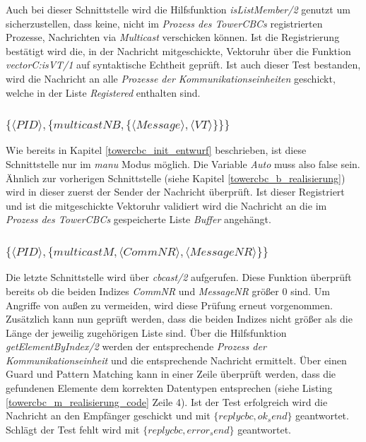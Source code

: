 Auch bei dieser Schnittstelle wird die Hilfsfunktion \textit{isListMember/2} genutzt um sicherzustellen, dass keine, nicht im \textit{Prozess des TowerCBCs} registrierten Prozesse, Nachrichten via \textit{Multicast} verschicken können. Ist die Registrierung bestätigt wird die, in der Nachricht mitgeschickte, Vektoruhr über die Funktion \textit{vectorC:isVT/1} auf syntaktische Echtheit geprüft. Ist auch dieser Test bestanden, wird die Nachricht an alle \textit{Prozesse der Kommunikationseinheiten} geschickt, welche in der Liste \textit{Registered} enthalten sind. 

\subsubsection{$\{\langle PID\rangle,\{multicastNB,\{\langle Message\rangle,\langle VT\rangle\}\}\}$} \label{towercbc_nb_realisierung}

Wie bereits in Kapitel \ref{towercbc_init_entwurf} beschrieben, ist diese Schnittstelle nur im \textit{manu} Modus möglich. Die Variable \textit{Auto} muss also false sein. Ähnlich zur vorherigen Schnittstelle (siehe Kapitel \ref{towercbc_b_realisierung}) wird in dieser zuerst der Sender der Nachricht überprüft. Ist dieser Registriert und ist die mitgeschickte Vektoruhr validiert wird die Nachricht an die im \textit{Prozess des TowerCBCs} gespeicherte Liste \textit{Buffer} angehängt.

\subsubsection{$\{\langle PID\rangle,\{multicastM,\langle CommNR\rangle,\langle MessageNR\rangle\}\}$} \label{towercbc_m_realisierung}

Die letzte Schnittstelle wird über \textit{cbcast/2} aufgerufen. Diese Funktion überprüft bereits ob die beiden Indizes \textit{CommNR} und \textit{MessageNR} größer 0 sind. Um Angriffe von außen zu vermeiden, wird diese Prüfung erneut vorgenommen. Zusätzlich kann nun geprüft werden, dass die beiden Indizes nicht größer als die Länge der jeweilig zugehörigen Liste sind. Über die Hilfsfunktion \textit{getElementByIndex/2} werden der entsprechende \textit{Prozess der Kommunikationseinheit} und die entsprechende Nachricht ermittelt. Über einen Guard und Pattern Matching kann in einer Zeile überprüft werden, dass die gefundenen Elemente dem korrekten Datentypen entsprechen (siehe Listing \ref{towercbc_m_realisierung_code} Zeile 4).
Ist der Test erfolgreich wird die Nachricht an den Empfänger geschickt und mit $\{replycbc, ok_send\}$ geantwortet. Schlägt der Test fehlt wird mit $\{replycbc, error_send\}$ geantwortet.

